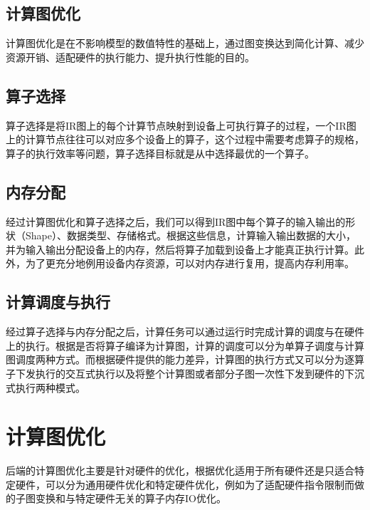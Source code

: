 \documentclass[letterpaper,10pt,english]{sphinxmanual}
\begin{document}
\subsection{计算图优化}
\label{\detokenize{chapter_backend_and_runtime/overview:id2}}
\sphinxAtStartPar
计算图优化是在不影响模型的数值特性的基础上，通过图变换达到简化计算、减少资源开销、适配硬件的执行能力、提升执行性能的目的。


\subsection{算子选择}
\label{\detokenize{chapter_backend_and_runtime/overview:id3}}
\sphinxAtStartPar
算子选择是将IR图上的每个计算节点映射到设备上可执行算子的过程，一个IR图上的计算节点往往可以对应多个设备上的算子，这个过程中需要考虑算子的规格，算子的执行效率等问题，算子选择目标就是从中选择最优的一个算子。


\subsection{内存分配}
\label{\detokenize{chapter_backend_and_runtime/overview:id4}}
\sphinxAtStartPar
经过计算图优化和算子选择之后，我们可以得到IR图中每个算子的输入输出的形状（Shape）、数据类型、存储格式。根据这些信息，计算输入输出数据的大小，并为输入输出分配设备上的内存，然后将算子加载到设备上才能真正执行计算。此外，为了更充分地例用设备内存资源，可以对内存进行复用，提高内存利用率。


\subsection{计算调度与执行}
\label{\detokenize{chapter_backend_and_runtime/overview:id5}}
\sphinxAtStartPar
经过算子选择与内存分配之后，计算任务可以通过运行时完成计算的调度与在硬件上的执行。根据是否将算子编译为计算图，计算的调度可以分为单算子调度与计算图调度两种方式。而根据硬件提供的能力差异，计算图的执行方式又可以分为逐算子下发执行的交互式执行以及将整个计算图或者部分子图一次性下发到硬件的下沉式执行两种模式。


\section{计算图优化}
\label{\detokenize{chapter_backend_and_runtime/graph_optimizer:id1}}\label{\detokenize{chapter_backend_and_runtime/graph_optimizer::doc}}
\sphinxAtStartPar
后端的计算图优化主要是针对硬件的优化，根据优化适用于所有硬件还是只适合特定硬件，可以分为通用硬件优化和特定硬件优化，例如为了适配硬件指令限制而做的子图变换和与特定硬件无关的算子内存IO优化。
\end{document}

